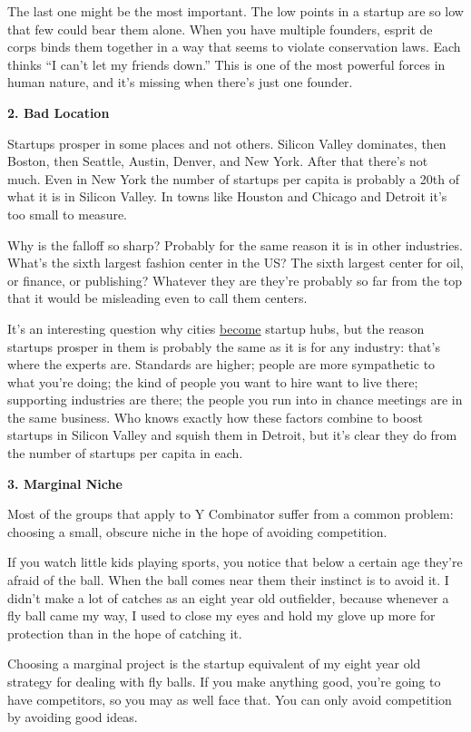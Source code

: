 The last one might be the most important. The low points in a startup
are so low that few could bear them alone. When you have multiple
founders, esprit de corps binds them together in a way that seems to
violate conservation laws. Each thinks ``I can't let my friends down.''
This is one of the most powerful forces in human nature, and it's
missing when there's just one founder.

\textbf{2. Bad Location}

Startups prosper in some places and not others. Silicon Valley
dominates, then Boston, then Seattle, Austin, Denver, and New York.
After that there's not much. Even in New York the number of startups per
capita is probably a 20th of what it is in Silicon Valley. In towns like
Houston and Chicago and Detroit it's too small to measure.

Why is the falloff so sharp? Probably for the same reason it is in other
industries. What's the sixth largest fashion center in the US? The sixth
largest center for oil, or finance, or publishing? Whatever they are
they're probably so far from the top that it would be misleading even to
call them centers.

It's an interesting question why cities
\href{siliconvalley.html}{become} startup hubs, but the reason startups
prosper in them is probably the same as it is for any industry: that's
where the experts are. Standards are higher; people are more sympathetic
to what you're doing; the kind of people you want to hire want to live
there; supporting industries are there; the people you run into in
chance meetings are in the same business. Who knows exactly how these
factors combine to boost startups in Silicon Valley and squish them in
Detroit, but it's clear they do from the number of startups per capita
in each.

\textbf{3. Marginal Niche}

Most of the groups that apply to Y Combinator suffer from a common
problem: choosing a small, obscure niche in the hope of avoiding
competition.

If you watch little kids playing sports, you notice that below a certain
age they're afraid of the ball. When the ball comes near them their
instinct is to avoid it. I didn't make a lot of catches as an eight year
old outfielder, because whenever a fly ball came my way, I used to close
my eyes and hold my glove up more for protection than in the hope of
catching it.

Choosing a marginal project is the startup equivalent of my eight year
old strategy for dealing with fly balls. If you make anything good,
you're going to have competitors, so you may as well face that. You can
only avoid competition by avoiding good ideas.

